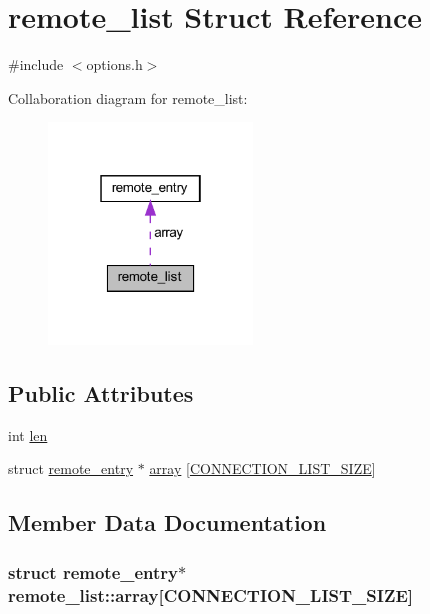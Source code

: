 \hypertarget{structremote__list}{}\section{remote\+\_\+list Struct Reference}
\label{structremote__list}


{\ttfamily \#include $<$options.\+h$>$}



Collaboration diagram for remote\+\_\+list\+:
\nopagebreak
\begin{figure}[H]
\begin{center}
\leavevmode
\includegraphics[width=154pt]{structremote__list__coll__graph}
\end{center}
\end{figure}
\subsection*{Public Attributes}
\begin{DoxyCompactItemize}
\item 
int \hyperlink{structremote__list_a36d74d8ccf19fbb642d2e307d14e3265}{len}
\item 
struct \hyperlink{structremote__entry}{remote\+\_\+entry} $\ast$ \hyperlink{structremote__list_a0f51fac13510b71455ec04d69c9a6bc1}{array} \mbox{[}\hyperlink{options_8h_a44d71253f2f8bdb9d87329f0d6eedce2}{C\+O\+N\+N\+E\+C\+T\+I\+O\+N\+\_\+\+L\+I\+S\+T\+\_\+\+S\+I\+Z\+E}\mbox{]}
\end{DoxyCompactItemize}


\subsection{Member Data Documentation}
\hypertarget{structremote__list_a0f51fac13510b71455ec04d69c9a6bc1}{}
\subsubsection[{array}]{\setlength{\rightskip}{0pt plus 5cm}struct {\bf remote\+\_\+entry}$\ast$ remote\+\_\+list\+::array\mbox{[}{\bf C\+O\+N\+N\+E\+C\+T\+I\+O\+N\+\_\+\+L\+I\+S\+T\+\_\+\+S\+I\+Z\+E}\mbox{]}}\label{structremote__list_a0f51fac13510b71455ec04d69c9a6bc1}
\hypertarget{structremote__list_a36d74d8ccf19fbb642d2e307d14e3265}{}
